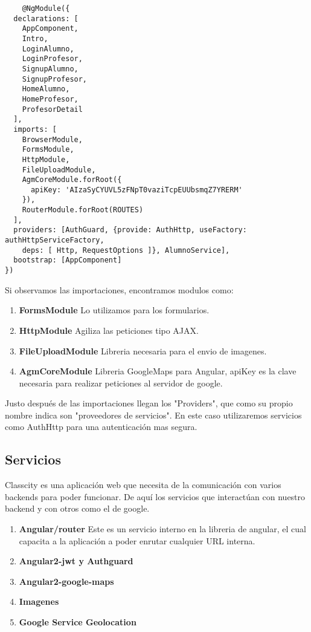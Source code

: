   \begin{lstlisting}  
    @NgModule({
  declarations: [
    AppComponent,
    Intro,
    LoginAlumno,
    LoginProfesor,
    SignupAlumno,
    SignupProfesor,
    HomeAlumno,
    HomeProfesor,
    ProfesorDetail
  ],
  imports: [
    BrowserModule,
    FormsModule,
    HttpModule,
    FileUploadModule,
    AgmCoreModule.forRoot({
      apiKey: 'AIzaSyCYUVL5zFNpT0vaziTcpEUUbsmqZ7YRERM'
    }),
    RouterModule.forRoot(ROUTES)
  ],
  providers: [AuthGuard, {provide: AuthHttp, useFactory: authHttpServiceFactory,
    deps: [ Http, RequestOptions ]}, AlumnoService],
  bootstrap: [AppComponent]
})
   \end{lstlisting}     
  
Si observamos las importaciones, encontramos modulos como:

\begin{enumerate}
 \item \textbf {FormsModule} Lo utilizamos para los formularios.
 \item \textbf {HttpModule} Agiliza las peticiones tipo AJAX.
 \item \textbf {FileUploadModule} Libreria necesaria para el envio de imagenes.
 \item \textbf {AgmCoreModule} Libreria GoogleMaps para Angular, apiKey es la clave necesaria para realizar peticiones al servidor de google.
\end{enumerate}
   
Justo después de las importaciones llegan los "Providers", que como su propio nombre indica son "proveedores de servicios". En este caso utilizaremos servicios como AuthHttp para una autenticación mas segura.



\subsection{Servicios}

Classcity es una aplicación web que necesita de la comunicación con varios backends para poder funcionar. De aquí los servicios que interactúan con nuestro backend y con otros como el de google.

\begin{enumerate}
    \item \textbf {Angular/router} Este es un servicio interno en la libreria de angular, el cual capacita a la aplicación a poder enrutar cualquier URL interna. 
    \item \textbf {Angular2-jwt y Authguard} 
    \item \textbf {Angular2-google-maps} 
    \item \textbf {Imagenes} 
    \item \textbf {Google Service Geolocation} 
    
\end{enumerate}


